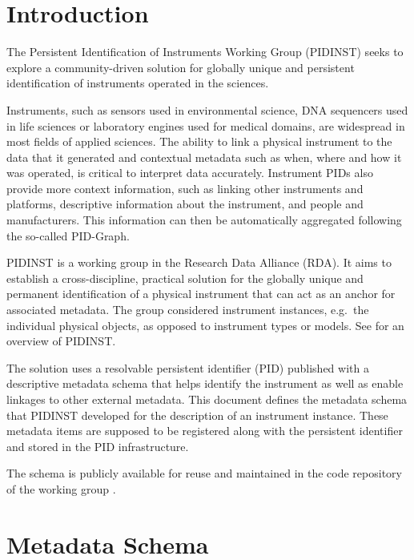 \documentclass[titlepage=true,twoside=false,DIV=13]{scrartcl}
\begin{document}
\tableofcontents
\cleardoublepage
{}

\section{Introduction}
\label{intro}

The Persistent Identification of Instruments Working Group (PIDINST)
seeks to explore a commu\-nity-driven solution for globally unique and
persistent identification of instruments operated in the sciences.

Instruments, such as sensors used in environmental science, DNA
sequencers used in life sciences or laboratory engines used for
medical domains, are widespread in most fields of applied sciences.
The ability to link a physical instrument to the data that it
generated and contextual metadata such as when, where and how it was
operated, is critical to interpret data accurately.  Instrument PIDs
also provide more context information, such as linking other
instruments and platforms, descriptive information about the
instrument, and people and manufacturers.  This information can then
be automatically aggregated following the so-called PID-Graph.

PIDINST is a working group in the Research Data Alliance (RDA).  It
aims to establish a cross-discipline, practical solution for the
globally unique and permanent identification of a physical instrument
that can act as an anchor for associated metadata.  The group
considered instrument instances, e.g.\ the individual physical
objects, as opposed to instrument types or models.  See
\cite{pidinst2020} for an overview of PIDINST.

The solution uses a resolvable persistent identifier (PID) published
with a descriptive metadata schema that helps identify the instrument
as well as enable linkages to other external metadata.  This document
defines the metadata schema that PIDINST developed for the description
of an instrument instance.  These metadata items are supposed to be
registered along with the persistent identifier and stored in the PID
infrastructure.

The schema is publicly available for reuse and maintained in the code
repository of the working group \cite{pidinst:github}.

\section{Metadata Schema}
\label{schema}
\end{document}
